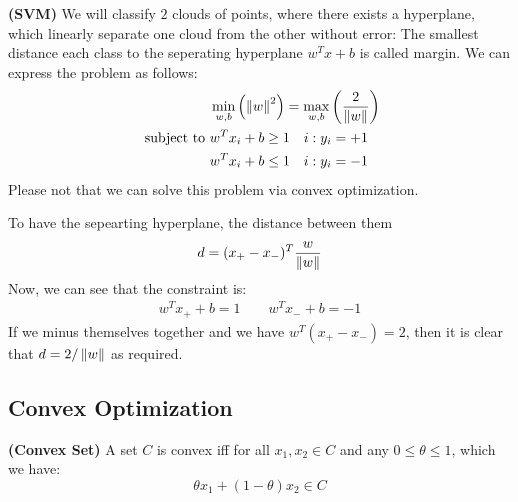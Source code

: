 \begin{definition}{\textbf{(SVM)}}
    We will classify $2$ clouds of points, where there exists a hyperplane, which linearly separate one cloud from the other without error: The smallest distance each class to the seperating hyperplane $w^Tx+b$ is called margin. We can express the problem as follows:
    \begin{equation*}
    \begin{aligned}
        &\min_{w, b}\left( \left\lVert w\right\rVert^2 \right) = \max_{w, b}\left( \frac{2}{\left\lVert w\right\rVert} \right) \\
        \text{ subject to }& \begin{aligned}[t]
            &w^Tx_i + b\ge1 \quad i : y_i = +1 \\ 
            &w^Tx_i + b\le1 \quad i : y_i = -1 \\ 
        \end{aligned}
    \end{aligned}
    \end{equation*}
    Please not that we can solve this problem via convex optimization. 
\end{definition}

\begin{remark}
    To have the sepearting hyperplane, the distance between them 
    \begin{equation*}
        d = (x_+ - x_-)^T\frac{w}{\left\lVert w\right\rVert}
    \end{equation*}
    Now, we can see that the constraint is:
    \begin{equation*}
    \begin{aligned}
        w^Tx_+ + b = 1 \qquad w^Tx_- + b = -1 
    \end{aligned}
    \end{equation*}
    If we minus themselves together and we have $w^T(x_+-x_-) = 2$, then it is clear that $d = 2/\left\lVert w\right\rVert$ as required.
\end{remark}

\subsection{Convex Optimization}

\begin{definition}{\textbf{(Convex Set)}}
    A set $C$ is convex iff for all $x_1, x_2\in C$ and any $0\le\theta\le1$, which we have:
    \begin{equation*}
        \theta x_1 + (1-\theta)x_2 \in C
    \end{equation*}    
\end{definition}

